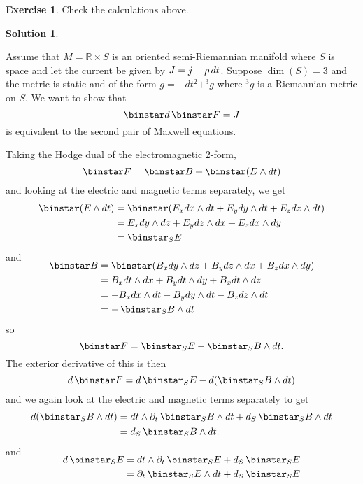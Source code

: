 \documentclass[11pt, a4paper]{report}
\theoremstyle{definition}
\newtheorem{exercise}{Exercise}[part]
\newtheorem{solution}{Solution}[part]
\newenvironment{ex}{\begin{exercise}}{\end{exercise}\pagebreak[1]}
\newenvironment{sol}{\begin{solution}}{\end{solution}\pagebreak[3]}
\renewcommand*{\d}{\ensuremath\mathop{}\mathopen{}d}
\renewcommand*{\star}{\ensuremath\mathop{}\mathopen\binstar\mathord{}}
\begin{document}
\begin{ex}

Check the calculations above.

\end{ex}

\begin{sol}\label{sol:secondpair}

Assume that $M = \mathbb{R} \times S$ is an oriented semi-Riemannian manifold where $S$ is space and let the current be given by $J = j - \rho \d t$. Suppose $\dim(S) = 3$ and the metric is static and of the form $g = -dt^2 + ^3 g$ where $^3 g$ is a Riemannian metric on $S$. We want to show that
\[
    \star d \star F = J
\]
is equivalent to the second pair of Maxwell equations.

Taking the Hodge dual of the electromagnetic 2-form,
\[
    \star F = \star B + \star (E \wedge dt)
\]
and looking at the electric and magnetic terms separately, we get
\begin{align*}
    \star (E \wedge dt) &= \star (E_x dx \wedge dt + E_y dy \wedge dt + E_z dz \wedge dt) \\
        &= E_x dy \wedge dz + E_y dz \wedge dx + E_z dx \wedge dy \\
        &= \star_S E
\end{align*}
and
\begin{align*}
    \SwapAboveDisplaySkip
    \star B &= \star (B_x dy \wedge dz + B_y dz \wedge dx + B_z dx \wedge dy) \\
            &= B_x dt \wedge dx + B_y dt \wedge dy + B_x dt \wedge dz \\
            &= - B_x dx \wedge dt - B_y dy \wedge dt - B_z dz \wedge dt \\
            &= - \star_S B \wedge dt
\end{align*}
so
\[
    \star F = \star_S E - \star_S B \wedge dt.
\]
The exterior derivative of this is then
\[
    d \star F = d \star_S E - d (\star_S B \wedge dt)
\]
and we again look at the electric and magnetic terms separately to get
\begin{align*}
     d (\star_S B \wedge dt) &= dt \wedge \partial_t \star_S B \wedge dt + d_S \star_S B \wedge dt \\
        &= d_S \star_S B \wedge dt.
\end{align*}
and
\begin{align*}
    \SwapAboveDisplaySkip
    d \star_S E &= dt \wedge \partial_t \star_S E + d_S \star_S E \\
        &= \partial_t \star_S E \wedge dt + d_S \star_S E \\

\end{align*}
\end{sol}
\end{document}
